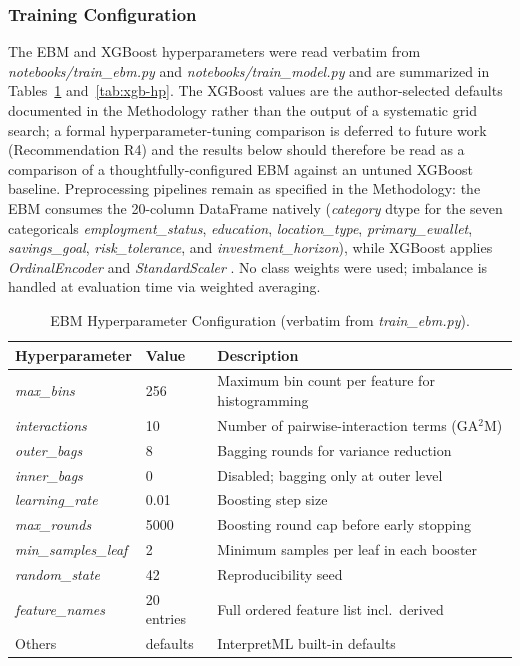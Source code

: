 \documentclass{icsthesis}
\begin{document}
\begin{mainmatter}
				\subsubsection{Training Configuration}
					The EBM and XGBoost hyperparameters were read verbatim from \emph{notebooks/train\_ebm.py} and \emph{notebooks/train\_model.py} and are summarized in Tables~\ref{tab:ebm-hp} and~\ref{tab:xgb-hp}. The XGBoost values are the author-selected defaults documented in the Methodology rather than the output of a systematic grid search; a formal hyperparameter-tuning comparison is deferred to future work (Recommendation R4) and the results below should therefore be read as a comparison of a thoughtfully-configured EBM against an untuned XGBoost baseline. Preprocessing pipelines remain as specified in the Methodology: the EBM consumes the 20-column DataFrame natively (\emph{category} dtype for the seven categoricals \emph{employment\_status}, \emph{education}, \emph{location\_type}, \emph{primary\_ewallet}, \emph{savings\_goal}, \emph{risk\_tolerance}, and \emph{investment\_horizon}), while XGBoost applies \emph{OrdinalEncoder} and \emph{StandardScaler} \cite{ref74}. No class weights were used; imbalance is handled at evaluation time via weighted averaging.

					\begin{table}[h]
					\vspace{4ex}
					\centering
					\caption{EBM Hyperparameter Configuration (verbatim from \emph{train\_ebm.py}).}
					\label{tab:ebm-hp}
					\footnotesize
					\begin{tabular}{|l|l|p{4cm}|}
						\hline
						\textbf{Hyperparameter} & \textbf{Value} & \textbf{Description} \\
						\hline
						\emph{max\_bins} & 256 & Maximum bin count per feature for histogramming \\
						\emph{interactions} & 10 & Number of pairwise-interaction terms (GA$^2$M) \\
						\emph{outer\_bags} & 8 & Bagging rounds for variance reduction \\
						\emph{inner\_bags} & 0 & Disabled; bagging only at outer level \\
						\emph{learning\_rate} & 0.01 & Boosting step size \\
						\emph{max\_rounds} & 5000 & Boosting round cap before early stopping \\
						\emph{min\_samples\_leaf} & 2 & Minimum samples per leaf in each booster \\
						\emph{random\_state} & 42 & Reproducibility seed \\
						\emph{feature\_names} & 20 entries & Full ordered feature list incl.\ derived \\
						Others & defaults & InterpretML built-in defaults \cite{ref15} \\
						\hline
					\end{tabular}
					\vspace{4ex}
					\end{table}


\end{mainmatter}
\end{document}
